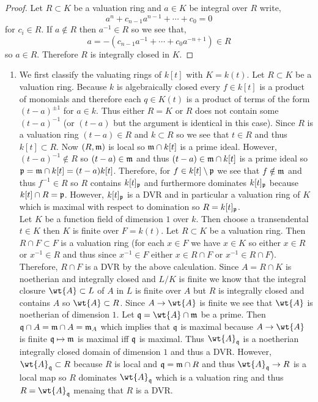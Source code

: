 \documentclass[12pt]{article}
\begin{document}
\begin{proof}
Let $R \subset K$ be a valuation ring and $a \in K$ be integral over $R$ write,
\[ a^n + c_{n-1} a^{n-1} + \cdots + c_0 = 0 \]
for $c_i \in R$. If $a \notin R$ then $a^{-1} \in R$ so we see that,
\[ a = -(c_{n-1} a^{-1} + \cdots + c_0 a^{-n+1}) \in R \]
so $a \in R$. Therefore $R$ is integrally closed in $K$.
\end{proof}

\begin{enumerate}
\item We first classify the valuating rings of $k[t]$ with $K = k(t)$. Let $R \subset K$ be a valuation ring. Because $k$ is algebraically closed every $f \in k[t]$ is a product of monomials and therefore each $q \in K(t)$ is a product of terms of the form $(t - a)^{\pm 1}$ for $a \in k$. Thus either $R = K$ or $R$ does not contain some $(t - a)^{-1}$ (or $(t - a)$ but the argument is identical in this case). Since $R$ is a valuation ring $(t - a) \in R$ and $k \subset R$ so we see that $t \in R$ and thus $k[t] \subset R$. Now $(R, \mathfrak{m})$ is local so $\mathfrak{m} \cap k[t]$ is a prime ideal. However, $(t - a)^{-1} \notin R$ so $(t - a) \in \mathfrak{m}$ and thus $(t - a) \in \mathfrak{m} \cap k[t]$ is a prime ideal so $\mathfrak{p} = \mathfrak{m} \cap k[t] = (t - a)k[t]$. Therefore, for $f \in k[t] \setminus \mathfrak{p}$ we see that $f \notin \mathfrak{m}$ and thus $f^{-1} \in R$ so $R$ contains $k[t]_{\mathfrak{p}}$ and furthermore dominates $k[t]_{\mathfrak{p}}$ because $k[t] \cap R = \mathfrak{p}$. However, $k[t]_{\mathfrak{p}}$ is a DVR and in particular a valuation ring of $K$ which is maximal with respect to domination so $R = k[t]_{\mathfrak{p}}$.  
\bigskip\\
Let $K$ be a function field of dimension $1$ over $k$. Then choose a transendental $t \in K$ then $K$ is finite over $F = k(t)$. Let $R \subset K$ be a valuation ring. Then $R \cap F \subset F$ is a valuation ring (for each $x \in F$ we have $x \in K$ so either $x \in R$ or $x^{-1} \in R$ and thus since $x^{-1} \in F$ either $x \in R \cap F$ or $x^{-1} \in R \cap F$). Therefore, $R \cap F$ is a DVR by the above calculation. Since $A = R \cap K$ is noetherian and integrally closed and $L/K$ is finite we know that the integral closure $\wt{A} \subset L$ of $A$ in $L$ is finite over $A$ but $R$ is integrally closed and contains $A$ so $\wt{A} \subset R$. Since $A \to \wt{A}$ is finite we see that $\wt{A}$ is noetherian of dimension $1$.  Let $\q = \wt{A} \cap \m$ be a prime. Then $\mathfrak{q} \cap A = \mathfrak{m} \cap A = \mathfrak{m}_A$ which implies that $\mathfrak{q}$ is maximal because $A \to \wt{A}$ is finite $\mathfrak{q} \mapsto \mathfrak{m}$ is maximal iff $\mathfrak{q}$ is maximal. Thus $\wt{A}_\q$ is a noetherian integrally closed domain of dimension $1$ and thus a DVR. However, $\wt{A}_\q \subset R$ because $R$ is local and $\mathfrak{q} = \mathfrak{m} \cap R$ and thus $\wt{A}_\q \to R$ is a local map so $R$ dominates $\wt{A}_\q$ which is a valuation ring and thus $R = \wt{A}_\q$ menaing that $R$ is a DVR.


\end{enumerate}
\end{document}
